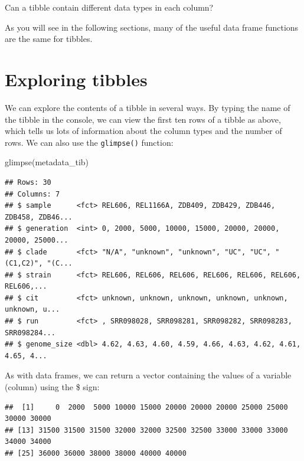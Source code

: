 \documentclass[
]{book}
\newenvironment{Shaded}{\begin{snugshade}}{\end{snugshade}}
\newcommand{\FunctionTok}[1]{\textcolor[rgb]{0.00,0.00,0.00}{#1}}
\newcommand{\NormalTok}[1]{#1}
\newcommand{\SpecialCharTok}[1]{\textcolor[rgb]{0.00,0.00,0.00}{#1}}
\begin{document}
Can a tibble contain different data types in each column?

As you will see in the following sections, many of the useful data frame functions are the same for tibbles.

\hypertarget{exploring-tibbles}{%
\section{Exploring tibbles}\label{exploring-tibbles}}

We can explore the contents of a tibble in several ways. By typing the name of the tibble in the console, we can view the first ten rows of a tibble as above, which tells us lots of information about the column types and the number of rows. We can also use the \texttt{glimpse()} function:

\begin{Shaded}
\begin{Highlighting}[]
\FunctionTok{glimpse}\NormalTok{(metadata\_tib)}
\end{Highlighting}
\end{Shaded}

\begin{verbatim}
## Rows: 30
## Columns: 7
## $ sample      <fct> REL606, REL1166A, ZDB409, ZDB429, ZDB446, ZDB458, ZDB46...
## $ generation  <int> 0, 2000, 5000, 10000, 15000, 20000, 20000, 20000, 25000...
## $ clade       <fct> "N/A", "unknown", "unknown", "UC", "UC", "(C1,C2)", "(C...
## $ strain      <fct> REL606, REL606, REL606, REL606, REL606, REL606, REL606,...
## $ cit         <fct> unknown, unknown, unknown, unknown, unknown, unknown, u...
## $ run         <fct> , SRR098028, SRR098281, SRR098282, SRR098283, SRR098284...
## $ genome_size <dbl> 4.62, 4.63, 4.60, 4.59, 4.66, 4.63, 4.62, 4.61, 4.65, 4...
\end{verbatim}

As with data frames, we can return a vector containing the values of a variable (column) using the \$ sign:

\begin{Shaded}
\end{Shaded}

\begin{verbatim}
##  [1]     0  2000  5000 10000 15000 20000 20000 20000 25000 25000 30000 30000
## [13] 31500 31500 31500 32000 32000 32500 32500 33000 33000 33000 34000 34000
## [25] 36000 36000 38000 38000 40000 40000
\end{verbatim}
\end{document}
